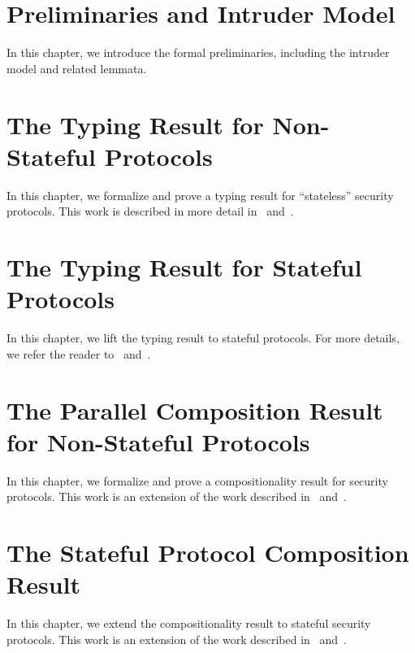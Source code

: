 \documentclass[10pt,DIV16,a4paper,abstract=true,twoside=semi,openright]
{scrreprt}
\begin{document}
\clearpage

% 

\chapter{Preliminaries and Intruder Model}
\label{cha:preliminaries}
In this chapter, we introduce the formal preliminaries, including the intruder model and related lemmata.





\chapter{The Typing Result for Non-Stateful Protocols}
\label{cha:typing}
In this chapter, we formalize and prove a typing result for ``stateless'' security protocols.
This work is described in more detail in~\cite{hess.ea:formalizing:2017} and~\cite[chapter 3]{hess:typing:2018}.





\chapter{The Typing Result for Stateful Protocols}
\label{cha:stateful-typing}
In this chapter, we lift the typing result to stateful protocols.
For more details, we refer the reader to~\cite{hess.ea:typing:2018} and~\cite[chapter 4]{hess:typing:2018}.



\chapter{The Parallel Composition Result for Non-Stateful Protocols}
\label{cha:composition}
In this chapter, we formalize and prove a compositionality result for security protocols.
This work is an extension of the work described in~\cite{hess.ea:stateful:2018} and~\cite[chapter 5]{hess:typing:2018}.



\chapter{The Stateful Protocol Composition Result}
\label{cha:stateful-composition}
In this chapter, we extend the compositionality result to stateful security protocols.
This work is an extension of the work described in~\cite{hess.ea:stateful:2018} and~\cite[chapter 5]{hess:typing:2018}.


\end{document}
